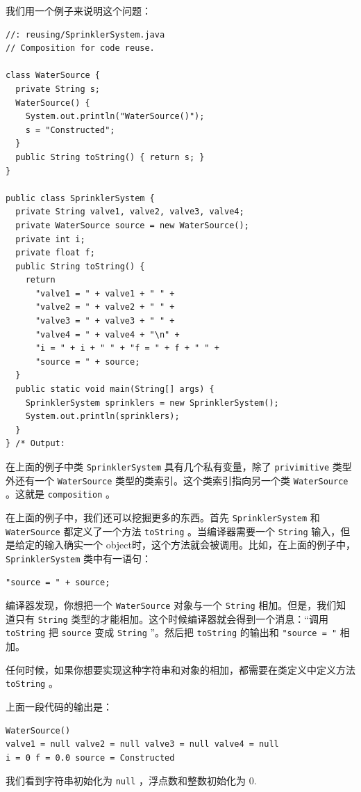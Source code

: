 \documentclass[10pt,a4paper,UTF8]{article}
\begin{document}
我们用一个例子来说明这个问题：
\lstset{language=C,label= ,caption= ,captionpos=b,firstnumber=1,numbers=left}
\begin{lstlisting}
//: reusing/SprinklerSystem.java
// Composition for code reuse.

class WaterSource {
  private String s;
  WaterSource() {
    System.out.println("WaterSource()");
    s = "Constructed";
  }
  public String toString() { return s; }
}

public class SprinklerSystem {
  private String valve1, valve2, valve3, valve4;
  private WaterSource source = new WaterSource();
  private int i;
  private float f;
  public String toString() {
    return
      "valve1 = " + valve1 + " " +
      "valve2 = " + valve2 + " " +
      "valve3 = " + valve3 + " " +
      "valve4 = " + valve4 + "\n" +
      "i = " + i + " " + "f = " + f + " " +
      "source = " + source;
  }
  public static void main(String[] args) {
    SprinklerSystem sprinklers = new SprinklerSystem();
    System.out.println(sprinklers);
  }
} /* Output:
\end{lstlisting}
在上面的例子中类 \texttt{SprinklerSystem} 具有几个私有变量，除了 \texttt{privimitive} 类型外还有一个 \texttt{WaterSource} 类型的类索引。这个类索引指向另一个类 \texttt{WaterSource} 。这就是 \texttt{composition} 。

在上面的例子中，我们还可以挖掘更多的东西。首先 \texttt{SprinklerSystem} 和 \texttt{WaterSource} 都定义了一个方法 \texttt{toString} 。当编译器需要一个 \texttt{String} 输入，但是给定的输入确实一个 object时，这个方法就会被调用。比如，在上面的例子中， \texttt{SprinklerSystem} 类中有一语句：
\lstset{language=java,label= ,caption= ,captionpos=b,numbers=none}
\begin{lstlisting}
"source = " + source;
\end{lstlisting}
编译器发现，你想把一个 \texttt{WaterSource} 对象与一个 \texttt{String} 相加。但是，我们知道只有 \texttt{String} 类型的才能相加。这个时候编译器就会得到一个消息：“调用 \texttt{toString} 把 \texttt{source} 变成 \texttt{String} ”。然后把 \texttt{toString} 的输出和  \texttt{"source = "} 相加。

任何时候，如果你想要实现这种字符串和对象的相加，都需要在类定义中定义方法 \texttt{toString} 。

上面一段代码的输出是：
\begin{verbatim}
WaterSource()
valve1 = null valve2 = null valve3 = null valve4 = null
i = 0 f = 0.0 source = Constructed
\end{verbatim}
我们看到字符串初始化为 \texttt{null} ，浮点数和整数初始化为 0.
\end{document}
